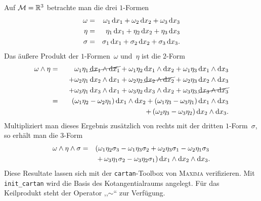 \begin{example}
\label{exa:Formen-Kleinprodukt}Auf $\mathcal{M}={\mathbb{R}}^{3}$ betrachte
man die drei $1$-Formen 
\begin{eqnarray*}
\omega & = & \omega_{1}\,{\mathrm{d}} x_{1}+\omega_{2}\,{\mathrm{d}} x_{2}+\omega_{3}\,{\mathrm{d}} x_{3}\\
\eta & = & \eta_{1}\,{\mathrm{d}} x_{1}+\eta_{2}\,{\mathrm{d}} x_{2}+\eta_{3}\,{\mathrm{d}} x_{3}\\
\sigma & = & \sigma_{1}\,{\mathrm{d}} x_{1}+\sigma_{2}\,{\mathrm{d}} x_{2}+\sigma_{3}\,{\mathrm{d}} x_{3}.
\end{eqnarray*}
Das äußere Produkt der $1$-Formen~$\omega$ und~$\eta$ ist die
$2$-Form 
\begin{eqnarray}
\omega\wedge\eta & = & \phantom{+}\omega_{1}\eta_{1}\,\cancel{{\mathrm{d}} x_{1}\wedge{\mathrm{d}} x_{1}}+\omega_{1}\eta_{2}\,{\mathrm{d}} x_{1}\wedge{\mathrm{d}} x_{2}+\omega_{1}\eta_{3}\,{\mathrm{d}} x_{1}\wedge{\mathrm{d}} x_{3}\nonumber \\
 &  & +\omega_{2}\eta_{1}\,{\mathrm{d}} x_{2}\wedge{\mathrm{d}} x_{1}+\omega_{2}\eta_{2}\,\cancel{{\mathrm{d}} x_{2}\wedge{\mathrm{d}} x_{2}}+\omega_{2}\eta_{3}\,{\mathrm{d}} x_{2}\wedge{\mathrm{d}} x_{3}\nonumber \\
 &  & +\omega_{3}\eta_{1}\,{\mathrm{d}} x_{3}\wedge{\mathrm{d}} x_{1}+\omega_{3}\eta_{2}\,{\mathrm{d}} x_{3}\wedge{\mathrm{d}} x_{2}+\omega_{3}\eta_{3}\,\cancel{{\mathrm{d}} x_{3}\wedge{\mathrm{d}} x_{3}}\nonumber \\
 & = & \phantom{+}\left(\omega_{1}\eta_{2}-\omega_{2}\eta_{1}\right){\mathrm{d}} x_{1}\wedge{\mathrm{d}} x_{2}+\left(\omega_{1}\eta_{3}-\omega_{3}\eta_{1}\right){\mathrm{d}} x_{1}\wedge{\mathrm{d}} x_{3}\nonumber \\
 &  & +\left(\omega_{2}\eta_{3}-\omega_{3}\eta_{2}\right){\mathrm{d}} x_{2}\wedge{\mathrm{d}} x_{3}.\label{eq:bsp-produkt-2-1-Formen}
\end{eqnarray}
Multipliziert man dieses Ergebnis zusätzlich von rechts mit der dritten
$1$-Form~$\sigma$, so erhält man die $3$-Form
\begin{eqnarray}
\omega\wedge\eta\wedge\sigma & = & \left(\omega_{1}\eta_{2}\sigma_{3}-\omega_{1}\eta_{3}\sigma_{2}+\omega_{2}\eta_{3}\sigma_{1}-\omega_{2}\eta_{1}\sigma_{3}\right.\nonumber \\
 &  & \left.+\,\omega_{3}\eta_{1}\sigma_{2}-\omega_{3}\eta_{2}\sigma_{1}\right){\mathrm{d}} x_{1}\wedge{\mathrm{d}} x_{2}\wedge{\mathrm{d}} x_{3}.\label{eq:bsp-produkt-3-1-Formen}
\end{eqnarray}
Diese Resultate lassen sich mit der \texttt{cartan}-Toolbox von \textsc{Maxima}
verifizieren. Mit \verb|init_cartan| wird die Basis des Kotangentialraums
angelegt. Für das Keilprodukt steht der Operator ,,$\sim$`` zur
Verfügung.

\begin{maxima}\end{maxima}
\end{example}

